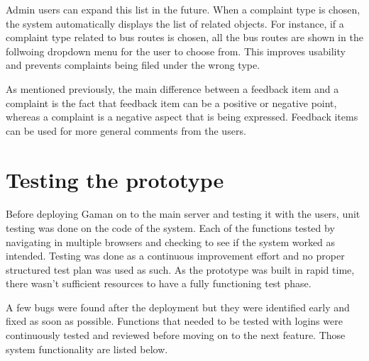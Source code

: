 Admin users can expand this list in the future. When a complaint type is chosen, the system automatically displays the list of related objects. For instance, if a complaint type related to bus routes is chosen, all the bus routes are shown in the follwoing dropdown menu for the user to choose from. This improves usability and prevents complaints being filed under the wrong type.

As mentioned previously, the main difference between a feedback item and a complaint is the fact that feedback item can be a positive or negative point, whereas a complaint is a negative aspect that is being expressed. Feedback items can be used for more general comments from the users.



\section{Testing the prototype}

\paragraph{} Before deploying Gaman on to the main server and testing it with the users, unit testing was done on the code of the system. Each of the functions tested by navigating in multiple browsers and checking to see if the system worked as intended. Testing was done as a continuous improvement effort and no proper structured test plan was used as such. As the prototype was built in rapid time, there wasn't sufficient resources to have a fully functioning test phase. 

A few bugs were found after the deployment but they were identified early and fixed as soon as possible. Functions that needed to be tested with logins were continuously tested and reviewed before moving on to the next feature. Those system functionality are listed below.

